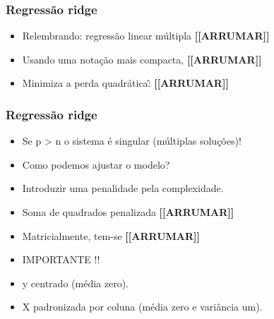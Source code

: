 \documentclass[
]{article}
\newenvironment{Shaded}{\begin{snugshade}}{\end{snugshade}}
\newcommand{\DocumentationTok}[1]{\textcolor[rgb]{0.56,0.35,0.01}{\textbf{\textit{#1}}}}
\begin{document}
\begin{Shaded}
\end{Shaded}

\hypertarget{regressuxe3o-ridge}{%
\subsubsection{Regressão ridge}\label{regressuxe3o-ridge}}

\begin{itemize}
\item
  Relembrando: regressão linear múltipla \textbf{{[}{[}ARRUMAR{]}{]}}
\item
  Usando uma notação mais compacta, \textbf{{[}{[}ARRUMAR{]}{]}}
\item
  Minimiza a perda quadrática:̂ \textbf{{[}{[}ARRUMAR{]}{]}}
\end{itemize}

\hypertarget{regressuxe3o-ridge-1}{%
\subsubsection{Regressão ridge}\label{regressuxe3o-ridge-1}}

\begin{itemize}
\item
  Se p \textgreater{} n o sistema é singular (múltiplas soluções)!
\item
  Como podemos ajustar o modelo?
\item
  Introduzir uma penalidade pela complexidade.
\item
  Soma de quadrados penalizada \textbf{{[}{[}ARRUMAR{]}{]}}
\item
  Matricialmente, tem-se \textbf{{[}{[}ARRUMAR{]}{]}}
\item
  IMPORTANTE !!
\item
  y centrado (média zero).
\item
  X padronizada por coluna (média zero e variância um).
\end{itemize}
\end{document}
